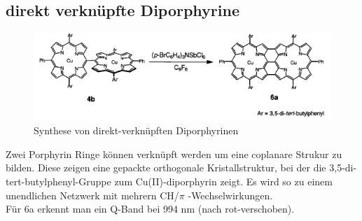 \subsection{direkt verknüpfte Diporphyrine}
\begin{figure}[htpb]
\centering
\includegraphics[scale=1]{graphics/diporphyrins}
\caption{Synthese von direkt-verknüpften Diporphyrinen}
\end{figure}
Zwei Porphyrin Ringe können verknüpft werden um eine coplanare Strukur zu bilden. Diese zeigen eine gepackte orthogonale Kristallstruktur, bei der die 3,5-di-tert-butylphenyl-Gruppe zum Cu(II)-diporphyrin zeigt. Es wird so zu einem unendlichen Netzwerk mit mehrern CH/$\pi$ -Wechselwirkungen.
\\Für 6a erkennt man ein Q-Band bei 994 nm (nach rot-verschoben).\cite{[11]}


